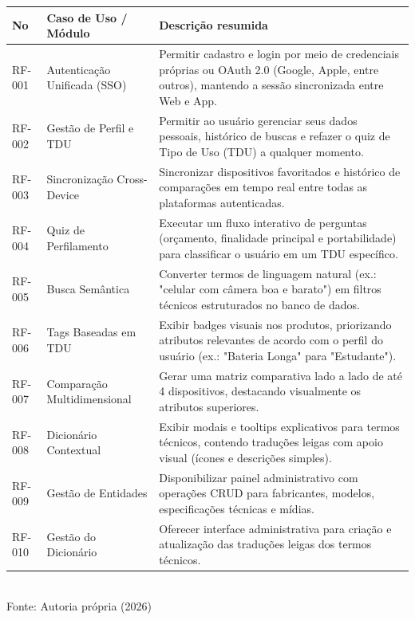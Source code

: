 \begin{quadro}[!htbp]
\centering
\caption{Casos de Uso x Requisitos funcionais}
    \begin{tabular}{ | m{1.7cm} | m{4cm}| m{9cm} | }
		\hline
		\cellcolor{gray!20}\textbf{No} & \cellcolor{gray!20}\textbf{Caso de Uso / Módulo} & \cellcolor{gray!20}\textbf{Descrição resumida} \\ \hline
		RF-001 & Autenticação Unificada (SSO) & Permitir cadastro e login por meio de credenciais próprias ou OAuth 2.0 (Google, Apple, entre outros), mantendo a sessão sincronizada entre Web e App. \\ \hline
		RF-002 & Gestão de Perfil e TDU & Permitir ao usuário gerenciar seus dados pessoais, histórico de buscas e refazer o quiz de Tipo de Uso (TDU) a qualquer momento. \\ \hline
      	RF-003 & Sincronização Cross-Device & Sincronizar dispositivos favoritados e histórico de comparações em tempo real entre todas as plataformas autenticadas. \\ \hline
      	RF-004 & Quiz de Perfilamento & Executar um fluxo interativo de perguntas (orçamento, finalidade principal e portabilidade) para classificar o usuário em um TDU específico. \\ \hline
      	RF-005 & Busca Semântica & Converter termos de linguagem natural (ex.: "celular com câmera boa e barato") em filtros técnicos estruturados no banco de dados. \\ \hline
      	RF-006 & Tags Baseadas em TDU & Exibir badges visuais nos produtos, priorizando atributos relevantes de acordo com o perfil do usuário (ex.: "Bateria Longa" para "Estudante"). \\ \hline
     	RF-007 & Comparação Multidimensional & Gerar uma matriz comparativa lado a lado de até 4 dispositivos, destacando visualmente os atributos superiores. \\ \hline
      	RF-008 & Dicionário Contextual & Exibir modais e tooltips explicativos para termos técnicos, contendo traduções leigas com apoio visual (ícones e descrições simples). \\ \hline
        RF-009 & Gestão de Entidades & Disponibilizar painel administrativo com operações CRUD para fabricantes, modelos, especificações técnicas e mídias. \\ \hline
        RF-010 & Gestão do Dicionário & Oferecer interface administrativa para criação e atualização das traduções leigas dos termos técnicos. \\ \hline
	\end{tabular}
    \label{tab:casosreq}
    \\ \vspace{0.2cm}
	Fonte: Autoria própria (2026)
\end{quadro}

